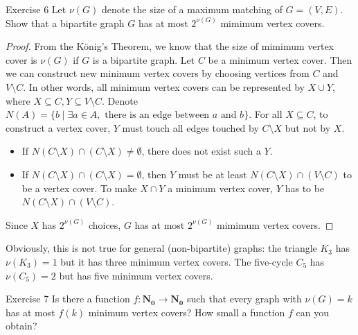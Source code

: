     \begin{thm}{Exercise 6}{}
        Let $\nu(G)$ denote the size of a maximum matching of $G=(V,E)$.
        Show that a bipartite graph $G$ has at most $2^{\nu(G)}$ mimimum vertex covers.
    \end{thm}
    \begin{proof}
        From the K\"{o}nig's Theorem, we know that the size of mimimum vertex cover is $\nu(G)$ if $G$ is a bipartite graph.
        Let $C$ be a minimum vertex cover.
        Then we can construct new minimum vertex covers by choosing vertices from $C$ and $V\setminus C$.
        In other words, all minimum vertex covers can be represented by $X\cup Y$, where $X\subseteq C, Y \subseteq V\setminus C$.
        Denote $N(A)=\{b \mid \exists a\in A, \text{ there is an edge between } a \text{ and } b \}$.
        For all $X\subseteq C$, to construct a vertex cover, $Y$ must touch all edges touched by $C\setminus X$ but not by $X$.
        \begin{itemize}
            \item If $N(C\setminus X)\cap (C\setminus X)\ne \emptyset$, there does not exist such a $Y$.
            \item  If $N(C\setminus X)\cap (C\setminus X)= \emptyset$, then $Y$ must be at least $N(C\setminus X) \cap (V\setminus C)$ to be a vertex cover.
            To make $X\cap Y$ a minimum vertex cover, $Y$ has to be $N(C\setminus X) \cap (V\setminus C)$.
        \end{itemize}
        
        Since $X$ has $2^{\nu(G)}$ choices, $G$ has at most $2^{\nu(G)}$ mimimum vertex covers.
    \end{proof}

    \newpage

    Obviously, this is not true for general (non-bipartite) graphs: the triangle $K_3$ has $\nu(K_3) = 1$ but it has three minimum vertex covers. The five-cycle $C_5$ has $\nu(C_5) = 2$ but has five minimum vertex covers.

    \begin{thm}{Exercise 7}{}
        Is there a function $f \colon \mathbf{N_0} \rightarrow \mathbf{N_0}$ such that every graph with $\nu(G) = k$ has at most $f(k)$ minimum vertex covers? How small a function $f$ can you obtain?
    \end{thm}

